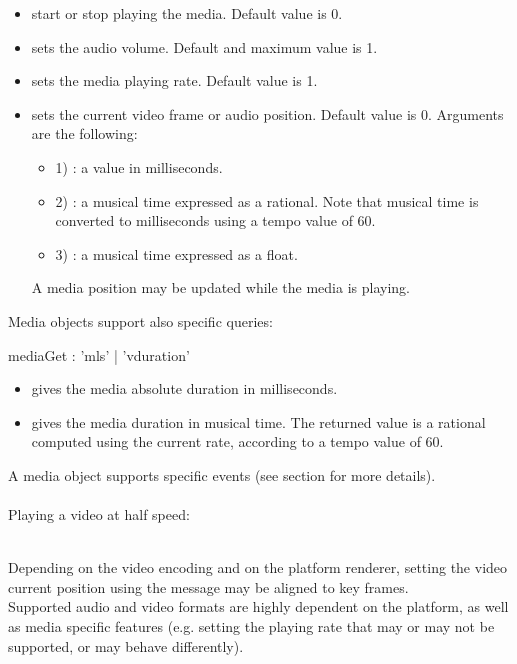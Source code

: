 \documentclass[a4paper,twoside]{report}
\begin{document}
\begin{itemize}
\item {} start or stop playing the media. Default value is 0. 
\item {} sets the audio volume. Default and maximum value is 1.
\item {} sets the media playing rate. Default value is 1.
\item {} sets the current video frame or audio position. Default value is 0. Arguments are the following:
\begin{itemize}
\item 1) : a value in milliseconds. 
\item 2) : a musical time expressed as a rational. Note that musical time is converted to milliseconds using a tempo value of 60. 
\item 3) : a musical time expressed as a float. 
\end{itemize}
A media position may be updated while the media is playing.
\end{itemize}

Media objects support also specific queries: 


\begin{rail}
mediaGet :	'mls'
			| 'vduration'
\end{rail}

\begin{itemize}
\item {} gives the media absolute duration in milliseconds.
\item {} gives the media duration in musical time. The returned value is a rational computed using the current rate, according to a tempo value of 60.
\end{itemize}

A media object supports specific events (see section  for more details). 
\\

\example \\
Playing a video at half speed:

\note \\
Depending on the video encoding and on the platform renderer, setting the video current position using the  message may be aligned to key frames.
\\
Supported audio and video formats are highly dependent on the platform, as well as media specific features (e.g. setting the playing rate that may or may not be supported, or may behave differently).  
\end{document}

